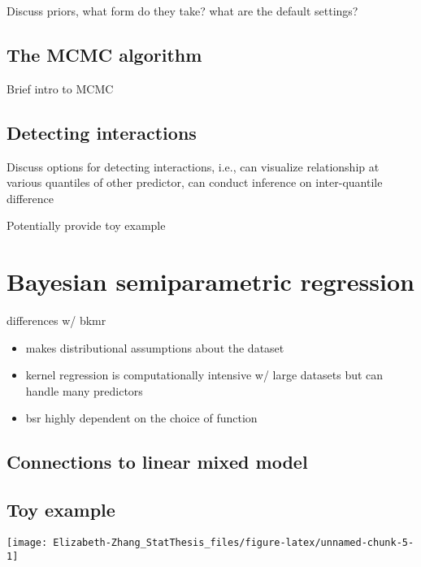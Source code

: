 \documentclass[12pt, twoside]{amherstthesis}
\providecommand{\tightlist}{%
  \setlength{\itemsep}{0pt}\setlength{\parskip}{0pt}}
\begin{document}
Discuss priors, what form do they take? what are the default settings?

\hypertarget{the-mcmc-algorithm}{%
\subsection{The MCMC algorithm}\label{the-mcmc-algorithm}}

Brief intro to MCMC

\hypertarget{detecting-interactions}{%
\subsection{Detecting interactions}\label{detecting-interactions}}

Discuss options for detecting interactions, i.e., can visualize relationship at various quantiles of other predictor, can conduct inference on inter-quantile difference

Potentially provide toy example

\hypertarget{bayesian-semiparametric-regression}{%
\section{Bayesian semiparametric regression}\label{bayesian-semiparametric-regression}}

differences w/ bkmr
\begin{itemize}
\tightlist
\item
  makes distributional assumptions about the dataset
\item
  kernel regression is computationally intensive w/ large datasets but can handle many predictors
\item
  bsr highly dependent on the choice of function
\end{itemize}
\hypertarget{connections-to-linear-mixed-model}{%
\subsection{Connections to linear mixed model}\label{connections-to-linear-mixed-model}}

\hypertarget{toy-example-1}{%
\subsection{Toy example}\label{toy-example-1}}
\begin{center}\texttt{[image: Elizabeth-Zhang\_StatThesis\_files/figure-latex/unnamed-chunk-5-1]} \end{center}
\end{document}
